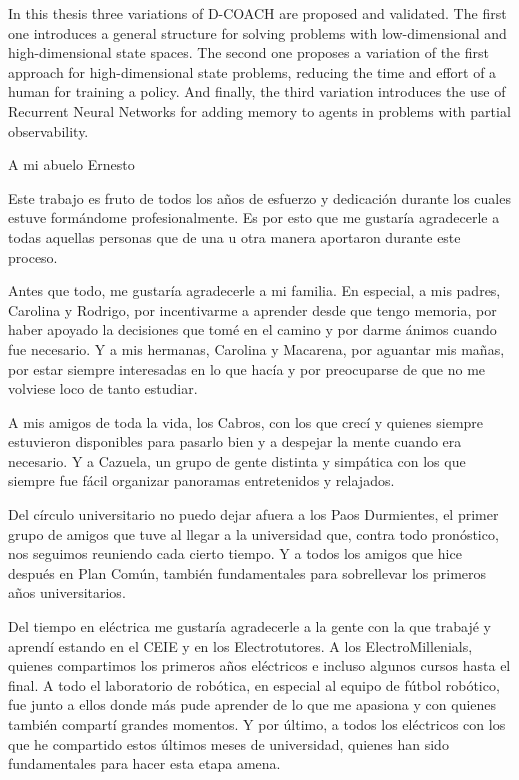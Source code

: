 \documentclass[upright, contnum]{umemoria}
\begin{document}
\begin{abstract_eng}
In this thesis three variations of D-COACH are proposed and validated. The first one introduces a general structure for solving problems with low-dimensional and high-dimensional state spaces. The second one proposes a variation of the first approach for high-dimensional state problems, reducing the time and effort of a human for training a policy. And finally, the third variation introduces the use of Recurrent Neural Networks for adding memory to agents in problems with partial observability.
\end{abstract_eng}


\begin{dedicatoria}
A mi abuelo Ernesto
\end{dedicatoria}

\begin{thanks}
Este trabajo es fruto de todos los años de esfuerzo y dedicación durante los cuales estuve formándome profesionalmente. Es por esto que me gustaría agradecerle a todas aquellas personas que de una u otra manera aportaron durante este proceso.

Antes que todo, me gustaría agradecerle a mi familia. En especial, a mis padres, Carolina y Rodrigo, por incentivarme a aprender desde que tengo memoria, por haber apoyado la decisiones que tomé en el camino y por darme ánimos cuando fue necesario. Y a mis hermanas, Carolina y Macarena, por aguantar mis mañas, por estar siempre interesadas en lo que hacía y por preocuparse de que no me volviese loco de tanto estudiar.

A mis amigos de toda la vida, los Cabros, con los que crecí y quienes siempre estuvieron disponibles para pasarlo bien y a despejar la mente cuando era necesario. Y a Cazuela, un grupo de gente distinta y simpática con los que siempre fue fácil organizar panoramas entretenidos y relajados.

Del círculo universitario no puedo dejar afuera a los Paos Durmientes, el primer grupo de amigos que tuve al llegar a la universidad que, contra todo pronóstico, nos seguimos reuniendo cada cierto tiempo. Y a todos los amigos que hice después en Plan Común, también fundamentales para sobrellevar los primeros años universitarios.

Del tiempo en eléctrica me gustaría agradecerle a la gente con la que trabajé y aprendí estando en el CEIE y en los Electrotutores. A los ElectroMillenials, quienes compartimos los primeros años eléctricos e incluso algunos cursos hasta el final. A todo el laboratorio de robótica, en especial al equipo de fútbol robótico, fue junto a ellos donde más pude aprender de lo que me apasiona y con quienes también compartí grandes momentos. Y por último, a todos los eléctricos con los que he compartido estos últimos meses de universidad, quienes han sido fundamentales para hacer esta etapa amena.


\end{thanks}
\end{document}
